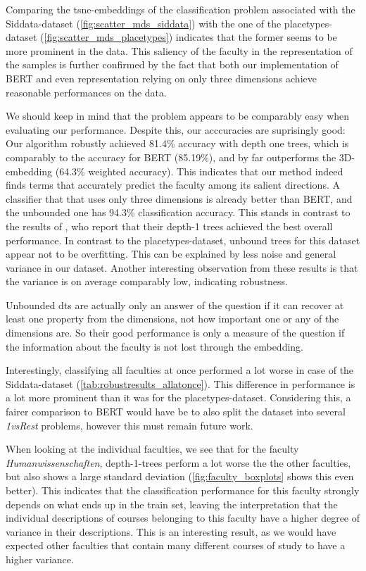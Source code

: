 Comparing the \gls{tsne}-embeddings of the classification problem associated with the Siddata-dataset (\autoref{fig:scatter_mds_siddata}) with the one of the placetypes-dataset (\autoref{fig:scatter_mds_placetypes}) indicates that the former seems to be more prominent in the data. This saliency of the faculty in the representation of the samples is further confirmed by the fact that both our implementation of BERT and even representation relying on only three dimensions achieve reasonable performances on the data.

We should keep in mind that the problem appears to be comparably easy when evaluating our performance. Despite this, our acccuracies are suprisingly good: Our algorithm robustly achieved  81.4\% accuracy with depth one trees, which is comparably to the accuracy for BERT (85.19\%), and by far outperforms the 3D-embedding (64.3\% weighted accuracy). This indicates that our method indeed finds terms that accurately predict the faculty among its salient directions. A classifier that that uses only three dimensions is already better than BERT, and the unbounded one has 94.3\% classification accuracy. This stands in contrast to the results of \cite{Ager2018}, who report that their depth-1 trees achieved the best overall performance. In contrast to the placetypes-dataset, unbound trees for this dataset appear not to be overfitting. This can be explained by less noise and general variance in our dataset. Another interesting observation from these results is that the variance is on average comparably low, indicating robustness. 

Unbounded \glspl{dt} are actually only an answer of the question if it can recover at least one property from the dimensions, not how important one or any of the dimensions are. So their good performance is only a measure of the question if the information about the faculty is not lost through the embedding.

Interestingly, classifying all faculties at once performed a lot worse in case of the Siddata-dataset (\autoref{tab:robustresults_allatonce}). This difference in performance is a lot more prominent than it was for the placetypes-dataset. %
Considering this, a fairer comparison to BERT would have be to also split the dataset into several \textit{1vsRest} problems, however this must remain future work. 


When looking at the individual faculties, we see that for the faculty \textit{Humanwissenschaften}, depth-1-trees perform a lot worse the the other faculties, but also shows a large standard deviation (\autoref{fig:faculty_boxplots} shows this even better). This indicates that the classification performance for this faculty strongly depends on what ends up in the train set, leaving the interpretation that the individual descriptions of courses belonging to this faculty have a higher degree of variance in their descriptions. This is an interesting result, as we would have expected other faculties that contain many different courses of study to have a higher variance. %

